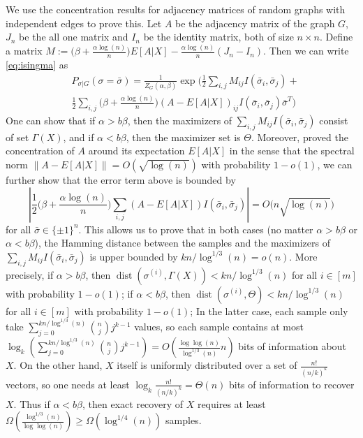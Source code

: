 \documentclass[conference]{IEEEtran}
\DeclareMathOperator{\dist}{dist}
\begin{document}
We use the concentration results for adjacency matrices of random graphs with independent edges to prove this.
Let $A$ be the adjacency matrix of the graph $G$, $J_n$ be the all one matrix and $I_n$ be the identity matrix, both of size $n\times n$.
Define a matrix
$
M:= \big(\beta+\frac{\alpha\log(n)}{n} \big) E[A|X]
-\frac{\alpha\log(n)}{n} (J_n-I_n).
$
Then we can write \eqref{eq:isingma}
as
\begin{align*}
&P_{\sigma|G}(\sigma=\bar{\sigma})
= \frac{1}{Z_G(\alpha,\beta)}
\exp\Big( \frac{1}{2} \sum_{i,j} M_{ij} I(\bar{\sigma}_i, \bar{\sigma}_j) + \\
& \frac{1}{2} \sum_{i,j}\big(\beta+\frac{\alpha\log(n)}{n} \big)  (A-E[A|X])_{ij} I(\bar{\sigma}_i, \bar{\sigma}_j) 
  \bar{\sigma}^T 
\Big)
\end{align*}
One can show that if $\alpha>b\beta$, then the maximizers of $\sum_{i,j} M_{ij} I(\bar{\sigma}_i, \bar{\sigma}_j)$ consist of set $\Gamma(X)$, and if $\alpha<b\beta$, then the maximizer set is $\Theta$.
Moreover, \cite{Hajek16} proved the concentration of $A$ around its expectation $E[A|X]$ in the sense that
the spectral norm $\|A-E[A|X]\| = O(\sqrt{\log(n)})$ with probability $1-o(1)$, we can further show that the error term above is bounded by
$$
\left|\frac{1}{2} \big(\beta+\frac{\alpha\log(n)}{n} \big)\sum_{i,j} (A-E[A|X])
 I( \bar{\sigma}_i, \bar{\sigma}_j) \right| = O \big( n \sqrt{\log(n)} \big)
$$
for all $\bar{\sigma}\in\{\pm 1\}^n$.
This allows us to prove that in both cases (no matter $\alpha>b\beta$ or $\alpha<b\beta$), the Hamming distance between the samples and the maximizers of $\sum_{i,j}  M_{ij}I(\bar{\sigma}_i, \bar{\sigma}_j)$ is upper bounded by $kn/\log^{1/3}(n)=o(n)$.
More precisely, if $\alpha>b\beta$, then $\dist(\sigma^{(i)},\Gamma(X) )< kn/\log^{1/3}(n)$ for all $i\in[m]$ with probability $1-o(1)$;
if $\alpha<b\beta$, then $\dist(\sigma^{(i)}, \Theta)< kn/\log^{1/3}(n)$ for all $i\in[m]$ with probability $1-o(1)$;
In the latter case, each sample only take $\sum_{j=0}^{kn/\log^{1/3}(n)}\binom{n}{j}j^{k-1}$ values, so each sample contains at most $\log_k(\sum_{j=0}^{kn/\log^{1/3}(n)}\binom{n}{j}j^{k-1})=O(\frac{\log\log(n)}{\log^{1/3}(n)} n)$ bits of information about $X$. On the other hand, $X$ itself is uniformly distributed over a set of $\frac{n!}{(n/k)^k}$ vectors, so one needs at least $\log_k\frac{n!}{(n/k)^k}=\Theta(n)$ bits of information to recover $X$. Thus if $\alpha<b\beta$, then exact recovery of $X$ requires at least $\Omega(\frac{\log^{1/3}(n)}{\log\log(n)})\ge \Omega(\log^{1/4}(n))$ samples.
\end{document}
